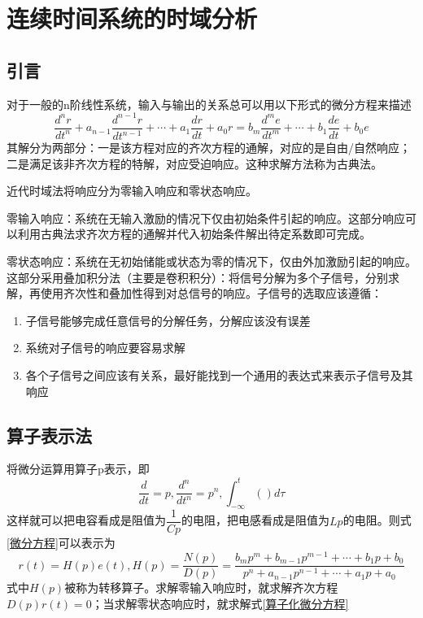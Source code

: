 \chapter{连续时间系统的时域分析}
\section{引言}
对于一般的n阶线性系统，输入与输出的关系总可以用以下形式的微分方程来描述
\begin{equation}
    \dfrac{d^n r}{dt^n}+a_{n-1}\dfrac{d^{n-1}r}{dt^{n-1}}+\cdots+a_{1}\dfrac{dr}{dt}+a_0 r=b_m\dfrac{d^{m}e}{dt^{m}}+\cdots+b_1\dfrac{de}{dt}+b_0 e
    \label{微分方程}
\end{equation}
其解分为两部分：一是该方程对应的齐次方程的通解，对应的是自由/自然响应；二是满足该非齐次方程的特解，对应受迫响应。这种求解方法称为古典法。

近代时域法将响应分为零输入响应和零状态响应。

零输入响应：系统在无输入激励的情况下仅由初始条件引起的响应。这部分响应可以利用古典法求齐次方程的通解并代入初始条件解出待定系数即可完成。

零状态响应：系统在无初始储能或状态为零的情况下，仅由外加激励引起的响应。这部分采用叠加积分法（主要是卷积积分）：将信号分解为多个子信号，分别求解，再使用齐次性和叠加性得到对总信号的响应。子信号的选取应该遵循：
\begin{enumerate}
    \item 子信号能够完成任意信号的分解任务，分解应该没有误差
    \item 系统对子信号的响应要容易求解
    \item 各个子信号之间应该有关系，最好能找到一个通用的表达式来表示子信号及其响应
\end{enumerate}
\section{算子表示法}
将微分运算用算子p表示，即
\begin{equation}
    \dfrac{d}{dt}=p,\dfrac{d^n}{dt^n}=p^n,\int_{-\infty}^{t}( )d \tau 
\end{equation}
这样就可以把电容看成是阻值为$\dfrac{1}{Cp}$的电阻，把电感看成是阻值为$Lp$的电阻。则式\ref{微分方程}可以表示为
\begin{equation}
    r(t)=H(p)e(t),H(p)=\dfrac{N(p)}{D(p)}=\dfrac{b_m p^m+b_{m-1}p^{m-1}+\cdots + b_1 p+b_0}{p^n+a_{n-1}p^{n-1}+\cdots + a_1 p +a_0}
    \label{算子化微分方程}
\end{equation}
式中$H(p)$被称为转移算子。求解零输入响应时，就求解齐次方程$D(p)r(t)=0$；当求解零状态响应时，就求解式\ref{算子化微分方程}
